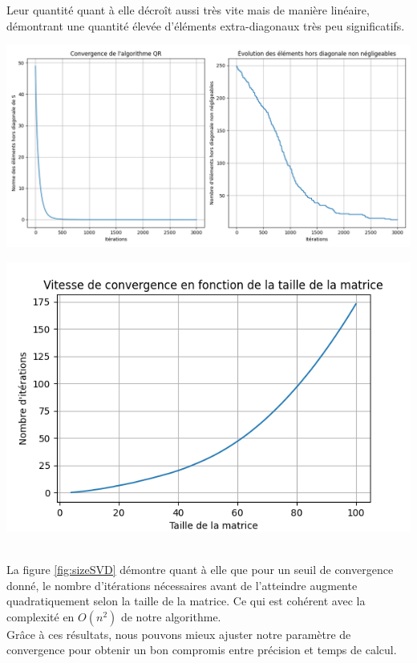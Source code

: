 \documentclass{article}
\begin{document}
Leur quantité quant à elle décroît aussi très vite mais de manière linéaire, démontrant une quantité élevée d'éléments extra-diagonaux très peu significatifs.\\
\begin{minipage}{0.55\textwidth}
  \centering
  \includegraphics[width=\textwidth]{svd_convergence.png}
  \label{fig:convergenceSVD}
\end{minipage}
\hfill
\begin{minipage}{0.4\textwidth}
  \centering
  \includegraphics[width=\textwidth]{svd_convergence_size.png}
  \label{fig:sizeSVD}
\end{minipage}
\\ La figure \ref{fig:sizeSVD} démontre quant à elle que pour un seuil de convergence donné, le nombre d'itérations nécessaires avant de l'atteindre augmente quadratiquement selon la taille de la matrice. Ce qui est cohérent avec la complexité en $O(n^2)$ de notre algorithme.\\
Grâce à ces résultats, nous pouvons mieux ajuster notre paramètre de convergence pour obtenir un bon compromis entre précision et temps de calcul.
\end{document}
